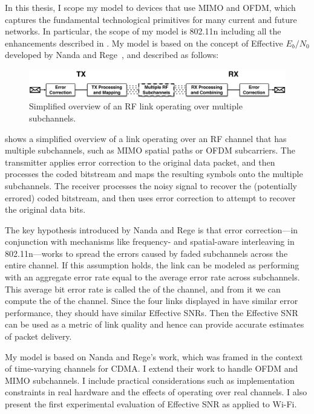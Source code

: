 In this thesis, I scope my model to devices that use MIMO and OFDM, which captures the fundamental technological primitives for many current and future networks. In particular, the scope of my model is 802.11n including all the enhancements described in . My model is based on the concept of Effective $E_b/N_0$ developed by Nanda and Rege~\cite{Nanda_EffectiveSNR}, and described as follows:
 
\begin{figure}[t!]
	\centering
	\includegraphics[width=\textwidth]{figures/approach/esnr_intuitive.pdf}
	\caption[Simplified overview of an RF link operating over multiple subchannels]{\label{fig:esnr_intuitive}Simplified overview of an RF link operating over multiple subchannels.}
\end{figure}

 shows a simplified overview of a link operating over an RF channel that has multiple subchannels, such as MIMO spatial paths or OFDM subcarriers. The transmitter applies error correction to the original data packet, and then processes the coded bitstream and maps the resulting symbols onto the multiple subchannels. The receiver processes the noisy signal to recover the (potentially errored) coded bitstream, and then uses error correction to attempt to recover the original data bits.

The key hypothesis introduced by Nanda and Rege is that error correction---in conjunction with mechanisms like frequency- and spatial-aware interleaving in 802.11n---works to spread the errors caused by faded subchannels across the entire channel. If this assumption holds, the link can be modeled as performing with an aggregate error rate equal to the average error rate across subchannels. This average bit error rate is called the  of the channel, and from it we can compute the  of the channel. Since the four links displayed in  have similar error performance, they should have similar Effective SNRs. Then the Effective SNR can be used as a metric of link quality and hence can provide accurate estimates of packet delivery.

My model is based on Nanda and Rege's work, which was framed in the context of time-varying channels for CDMA. I extend their work to handle OFDM and MIMO subchannels. I include practical considerations such as implementation constraints in real hardware and the effects of operating over real channels. I also present the first experimental evaluation of Effective SNR as applied to Wi-Fi.

